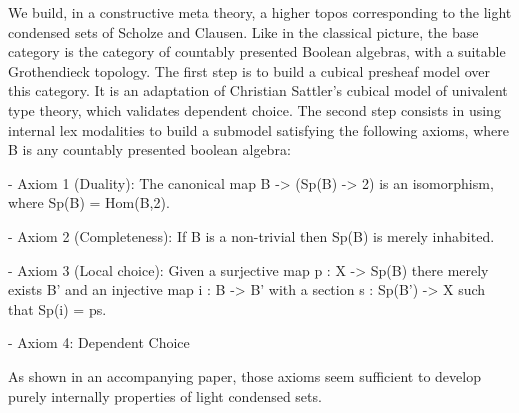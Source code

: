 We build, in a constructive meta theory, a higher topos corresponding to the light condensed sets of Scholze and Clausen.
Like in the classical picture, the base category is the category of countably presented Boolean algebras, with a suitable Grothendieck topology.
The first step is to build a cubical presheaf model over this category. It is an adaptation of Christian Sattler's cubical model of univalent type theory, which validates dependent choice. The second step consists in using internal lex modalities to build a submodel satisfying the following axioms, where B is any countably presented boolean algebra:

- Axiom 1 (Duality): The canonical map B -> (Sp(B) -> 2) is an isomorphism, where Sp(B) = Hom(B,2).

- Axiom 2 (Completeness): If B is a non-trivial then Sp(B) is merely inhabited.

- Axiom 3 (Local choice): Given a surjective map p : X -> Sp(B) there merely exists B' and an injective map
i : B -> B' with a section s : Sp(B') -> X such that Sp(i) = ps.

- Axiom 4: Dependent Choice

As shown in an accompanying paper, those axioms seem sufficient to develop purely internally properties of light condensed sets.